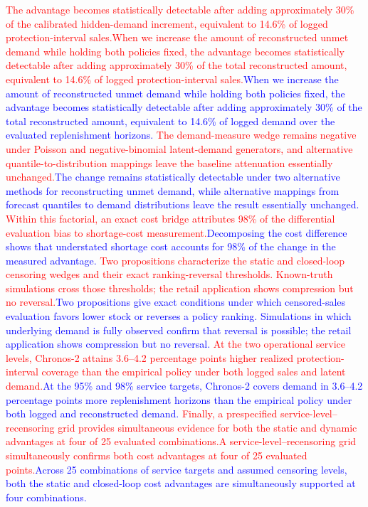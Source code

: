 \documentclass[msom,dblanonrev]{informs4}
\newcommand{\add}[1]{\textcolor{blue}{#1}}
\newcommand{\reduce}[1]{\textcolor{red}{#1}\hspace{0.5em}}
\begin{document}
{\reduce{The advantage becomes statistically detectable after adding approximately 30\% of the calibrated hidden-demand increment, equivalent to 14.6\% of logged protection-interval sales.}\reduce{When we increase the amount of reconstructed unmet demand while holding both policies fixed, the advantage becomes statistically detectable after adding approximately 30\% of the total reconstructed amount, equivalent to 14.6\% of logged protection-interval sales.}\add{When we increase the amount of reconstructed unmet demand while holding both policies fixed, the advantage becomes statistically detectable after adding approximately 30\% of the total reconstructed amount, equivalent to 14.6\% of logged demand over the evaluated replenishment horizons.}
\reduce{The demand-measure wedge remains negative under Poisson and negative-binomial latent-demand generators, and alternative quantile-to-distribution mappings leave the baseline attenuation essentially unchanged.}\add{The change remains statistically detectable under two alternative methods for reconstructing unmet demand, while alternative mappings from forecast quantiles to demand distributions leave the result essentially unchanged.}
\reduce{Within this factorial, an exact cost bridge attributes 98\% of the differential evaluation bias to shortage-cost measurement.}\add{Decomposing the cost difference shows that understated shortage cost accounts for 98\% of the change in the measured advantage.}
\reduce{Two propositions characterize the static and closed-loop censoring wedges and their exact ranking-reversal thresholds. Known-truth simulations cross those thresholds; the retail application shows compression but no reversal.}\add{Two propositions give exact conditions under which censored-sales evaluation favors lower stock or reverses a policy ranking. Simulations in which underlying demand is fully observed confirm that reversal is possible; the retail application shows compression but no reversal.}
\reduce{At the two operational service levels, Chronos-2 attains 3.6--4.2 percentage points higher realized protection-interval coverage than the empirical policy under both logged sales and latent demand.}\add{At the 95\% and 98\% service targets, Chronos-2 covers demand in 3.6--4.2 percentage points more replenishment horizons than the empirical policy under both logged and reconstructed demand.}
\reduce{Finally, a prespecified service-level--recensoring grid provides simultaneous evidence for both the static and dynamic advantages at four of 25 evaluated combinations.}\reduce{A service-level--recensoring grid simultaneously confirms both cost advantages at four of 25 evaluated points.}\add{Across 25 combinations of service targets and assumed censoring levels, both the static and closed-loop cost advantages are simultaneously supported at four combinations.}
}
\end{document}

